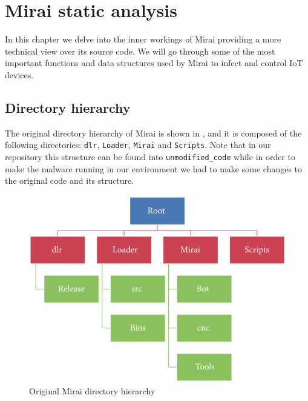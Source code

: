 \chapter{Mirai static analysis}
\label{chapter:mirai-static-analysis}

In this chapter we delve into the inner workings of Mirai providing a more technical view over its source code. We will go through some of the most important functions and data structures used by Mirai to infect and control IoT devices.

\section{Directory hierarchy}

The original directory hierarchy of Mirai is shown in , and it is composed of the following directories: \texttt{dlr}, \texttt{Loader}, \texttt{Mirai} and \texttt{Scripts}. Note that in our repository this structure can be found into \texttt{unmodified\_code} while in order to make the malware running in our environment we had to make some changes to the original code and its structure. 

\begin{figure}[ht]
    \centering
    \includegraphics[scale=0.4]{resources/images/folder-structure.png}
    \caption{Original Mirai directory hierarchy \cite{de2018ddos}}
    \label{fig:folder-hierarchy}
\end{figure}

